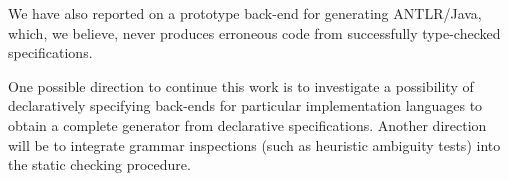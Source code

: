 \documentclass{llncs2e/llncs}
\newcommand{\tool}[1]{\textsc{#1}}
\begin{document}
We have also reported on a prototype back-end for generating \tool{ANTLR}/Java, which, we believe, never produces erroneous code from successfully type-checked specifications.

One possible direction to continue this work is to investigate a possibility of declaratively specifying back-ends for particular implementation languages to obtain a complete generator from declarative specifications. Another direction will be to integrate grammar inspections (such as heuristic ambiguity tests) into the static checking procedure.





\end{document}
